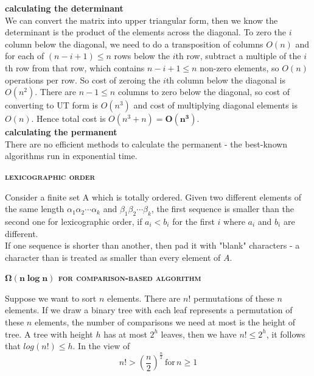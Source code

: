 \documentclass[a4paper]{article}
\begin{document}
\begin{multicols}{2}
\begin{framed}
	\noindent
	\textbf{calculating the determinant}\\
	We can convert the matrix into upper triangular form, then we know the determinant is the product of the elements across the diagonal. To zero the $i$ column below the diagonal, we need to do a transposition of columns $O(n)$ and for each of $(n - i + 1) \leq n$ rows below the $i$th row, subtract a multiple of the $i$th row from that row, which contains $n - i + 1 \leq n$ non-zero elements, so $O(n)$ operations per row. So cost of zeroing the $i$th column below the diagonal is $O(n^2)$. There are $n - 1 \leq n$ columns to zero below the diagonal, so cost of converting to UT form is $O(n^3)$ and cost of multiplying diagonal elements is $O(n)$. Hence total cost is $O(n^3 + n) = \bm{O(n^3)}$.\\
	
	\noindent
	\textbf{calculating the permanent}\\
	There are no efficient methods to calculate the permanent - the best-known algorithms run in exponential time.
\end{framed}

\begin{framed}
\begin{center}
	\textbf{\textsc{lexicographic order}}
\end{center}

\noindent
Consider a finite set A which is totally ordered. Given two different elements of the same length $\alpha_1\alpha_2\cdots\alpha_k$ and $\beta_1\beta_2\cdots\beta_k$, the first sequence is smaller than the second one for lexicographic order, if $a_i < b_i$ for the first $i$ where $a_i$ and $b_i$ are different.\\

\noindent
If one sequence is shorter than another, then pad it with "blank" characters - a character than is treated as smaller than every element of $A$.
\end{framed}

\begin{framed}
\begin{center}
	\textbf{\textsc{$\bm{\Omega(n\log n)}$ for comparison-based algorithm}}
\end{center}

\noindent
Suppose we want to sort $n$ elements. There are $n!$ permutations of these $n$ elements. If we draw a binary tree with each leaf represents a permutation of these $n$ elements, the number of comparisons we need at most is the height of tree. A tree with height $h$ has at most $2^h$ leaves, then we have $n! \leq 2^h$, it follows that $log(n!) \leq h$. In the view of $$n! > (\frac{n}{2})^\frac{n}{2} \, \text{for} \, n \geq 1$$ 


\end{framed}
\end{multicols}
\end{document}
